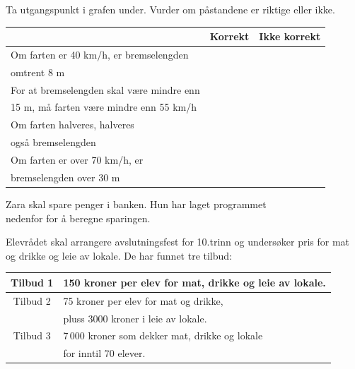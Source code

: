 \newpage
{}
Ta utgangspunkt i grafen under. Vurder om påstandene er riktige eller ikke. 
\begin{center}
	\small
\begin{tabular}{|l | c | c|}
	\hline
	& Korrekt & Ikke korrekt \\ \hline
	Om farten er 40 km/h, er bremselengden & & \\
	omtrent 8 m & &\\ \hline
	For at bremselengden skal være mindre enn  & & \\
	15 m, må farten være mindre enn 55 km/h & & \\ \hline
	Om farten halveres, halveres & & \\
	også bremselengden & &\\ \hline
	Om farten er over 70 km/h, er & & \\
	bremselengden  over 30 m  & & \\ \hline
\end{tabular}
\end{center}

Zara skal spare penger i banken. Hun har laget programmet \\ nedenfor for å beregne sparingen.

\newpage
{}
Elevrådet skal arrangere avslutningsfest for 10.trinn og undersøker pris for mat og drikke og leie av lokale. De har funnet tre tilbud: 
\begin{center}
	\begin{tabular}{c | l}
		\hline
		Tilbud 1 & 150 kroner per elev for mat, drikke og leie av lokale. \\ \hline
		Tilbud 2 & 75 kroner per elev for mat og drikke, \\
		& pluss 3000 kroner i leie av lokale.  \\ \hline
		Tilbud 3 & 7\,000 kroner som dekker mat, drikke og lokale \\
		&for inntil 70 elever. \\ \hline
	\end{tabular}
\end{center}

